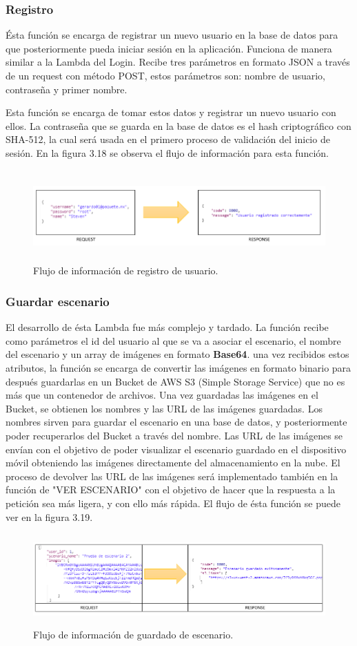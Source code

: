 \subsubsection{Registro}
Ésta función se encarga de registrar un nuevo usuario en la base de datos para que posteriormente pueda iniciar sesión en la aplicación. Funciona de manera similar a la Lambda del Login. Recibe tres parámetros en formato JSON a través de un request con método POST, estos parámetros son: nombre de usuario, contraseña y primer nombre. \par
Esta función se encarga de tomar estos datos y registrar un nuevo usuario con ellos. La contraseña que se guarda en la base de datos es el hash criptográfico con SHA-512, la cual será usada en el primero proceso de validación del inicio de sesión. En la figura 3.18 se observa el flujo de información para esta función.
\begin{figure}[h!]
	\centering
	\includegraphics[width=15cm,height=3.5cm]{imagenes/desarrollo/arquitectura/REGISTER_SUCCESS.png}
	\caption{Flujo de información de registro de usuario.}
	\label{fig:regsuccess}
\end{figure}

\subsubsection{Guardar escenario}
El desarrollo de ésta Lambda fue más complejo y tardado. La función recibe como parámetros el id del usuario al que se va a asociar el escenario, el nombre del escenario y un array de imágenes en formato \textbf{Base64}. una vez recibidos estos atributos, la función se encarga de convertir las imágenes en formato binario para después guardarlas en un Bucket de AWS S3 (Simple Storage Service) que no es más que un contenedor de archivos. Una vez guardadas las imágenes en el Bucket, se obtienen los nombres y las URL de las imágenes guardadas. Los nombres sirven para guardar el escenario en una base de datos, y posteriormente poder recuperarlos del Bucket a través del nombre. Las URL de las imágenes se envían con el objetivo de poder visualizar el escenario guardado en el dispositivo móvil obteniendo las imágenes directamente del almacenamiento en la nube. El proceso de devolver las URL de las imágenes será implementado también en la función de "VER ESCENARIO" con el objetivo de hacer que la respuesta a la petición sea más ligera, y con ello más rápida. El flujo de ésta función se puede ver en la figura 3.19.

\begin{figure}[h!]
	\centering
	\includegraphics[width=15cm,height=3.5cm]{imagenes/desarrollo/arquitectura/STORESC_SUCCESS.png}
	\caption{Flujo de información de guardado de escenario.}
	\label{fig:regsuccess}
\end{figure}